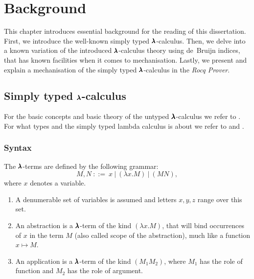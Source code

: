 \chapter{Background}
\label{c:background}


This chapter introduces essential background for the reading of this dissertation.
First, we introduce the well-known simply typed $\pmb{\lambda}$-calculus.
Then, we delve into a known variation of the introduced $\pmb{\lambda}$-calculus theory using de~Bruijn indices, that has known facilities when it comes to mechanisation.
Lastly, we present and explain a mechanisation of the simply typed $\pmb{\lambda}$-calculus in the \textit{Rocq Prover}.

\section{Simply typed $\pmb{\lambda}$-calculus}

For the basic concepts and basic theory of the untyped $\pmb{\lambda}$-calculus we refer to \cite{Barendregt1987}.
For what types and the simply typed lambda calculus is about we refer to \cite{Barendregt2013} and \cite{Hindley1997}.

\subsection{Syntax}

\begin{definition}
  The $\pmb{\lambda}$-terms are defined by the following grammar:
  \[ M, N \ ::= \ x \ | \ (\lambda x . M) \ | \ (M N) , \]
  where $x$ denotes a variable.
\end{definition}

\begin{remark} \hfill
  \begin{enumerate}
  \item A denumerable set of variables is assumed and letters $x, y, z$ range over this set.
  \item An abstraction is a $\pmb{\lambda}$-term of the kind $(\lambda x. M)$, that will bind occurrences of $x$ in the term $M$ (also called scope of the abstraction), much like a function $x \mapsto M$.
  \item An application is a $\pmb{\lambda}$-term of the kind $(M_1 M_2)$, where $M_1$ has the role of function and $M_2$ has the role of argument.
  \end{enumerate}
\end{remark}

